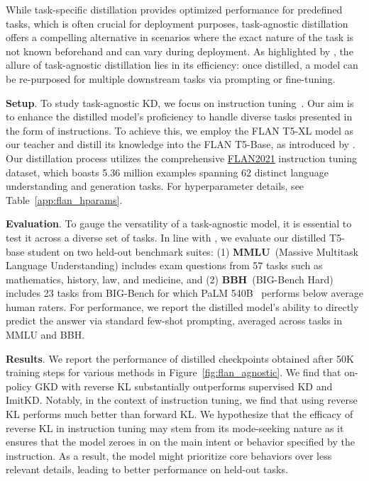 \documentclass{article} %
\newcommand{\addtext}[1]{#1}
\begin{document}
\addtext{
While task-specific distillation provides optimized performance for predefined tasks, which is often crucial for deployment purposes,  task-agnostic distillation offers a compelling alternative in scenarios where the exact nature of the task is not known beforehand and can vary during deployment. As highlighted by \citet{sanh2019distilbert}, the allure of task-agnostic distillation lies in its efficiency: once distilled, a model can be re-purposed for multiple downstream tasks via prompting or fine-tuning. 

\textbf{Setup}. To study task-agnostic KD, we focus on instruction tuning~\citep{chung2022scaling}. Our aim is to enhance the distilled model's proficiency to handle diverse tasks presented in the form of instructions. To achieve this, we employ the FLAN T5-XL model as our teacher and distill its knowledge into the FLAN T5-Base, as introduced by \citet{chung2022scaling}. Our distillation process utilizes the comprehensive \href{https://huggingface.co/datasets/conceptofmind/flan2021_submix_original}{FLAN2021} 
instruction tuning dataset, which boasts 5.36 million examples spanning 62 distinct language understanding and generation tasks. For hyperparameter details, see Table~\ref{app:flan_hparams}.

\textbf{Evaluation}. To gauge the versatility of a task-agnostic model, it is essential to test it across a diverse set of tasks. In line with \citet{chung2022scaling}, we evaluate our distilled T5-base student on two held-out benchmark suites: (1) \textbf{MMLU}~(Massive Multitask Language Understanding) includes exam questions from 57 tasks such as mathematics, history, law, and medicine, and (2) \textbf{BBH}~(BIG-Bench Hard) includes 23 tasks from BIG-Bench for which PaLM 540B~\citep{chowdhery2022palm} performs below average human raters. For performance, we report the distilled model's ability to directly predict the answer via standard few-shot prompting, averaged across tasks in MMLU and BBH.

\textbf{Results}. We report the performance of distilled checkpoints obtained after 50K training steps for various methods in Figure~\ref{fig:flan_agnostic}. We find that on-policy GKD with reverse KL substantially outperforms supervised KD and ImitKD. Notably, in the context of instruction tuning, we
find that using reverse KL performs much better than forward KL. We hypothesize that the efficacy of reverse KL in instruction tuning may stem from its mode-seeking nature as it ensures that the model zeroes in on the main intent or behavior specified by the instruction. As a result, the model might prioritize core behaviors over less relevant details, leading to better performance on held-out tasks.
}
\end{document}
